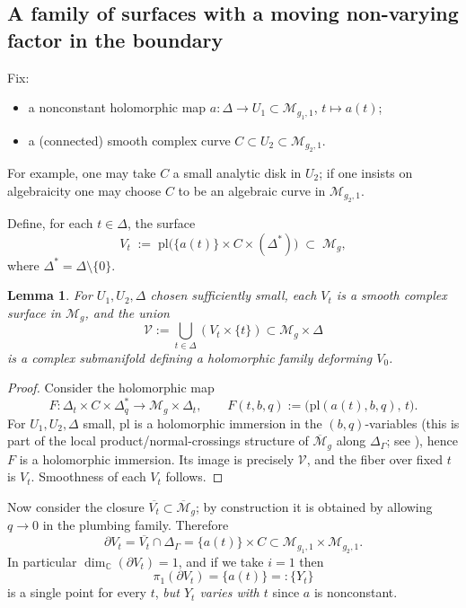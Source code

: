 \documentclass[11pt]{article}
\newtheorem{lemma}[theorem]{Lemma}
\newcommand{\Mg}{\mathcal M_g}
\newcommand{\Mgn}[2]{\mathcal M_{#1,#2}}
\newcommand{\Mbar}{\overline{\mathcal M}_g}
\newcommand{\C}{\mathbb C}
\newcommand{\D}{\Delta}
\begin{document}
\subsection{A family of surfaces with a moving non-varying factor in the boundary}

Fix:
\begin{itemize}
\item a nonconstant holomorphic map $a:\D\to U_1\subset \Mgn{g_1}{1}$, $t\mapsto a(t)$;
\item a (connected) smooth complex curve $C\subset U_2\subset \Mgn{g_2}{1}$.
\end{itemize}
For example, one may take $C$ a small analytic disk in $U_2$; if one insists on algebraicity one may choose $C$ to be an algebraic curve in $\Mgn{g_2}{1}$.

Define, for each $t\in\D$, the surface
\[
V_t \;:=\; \mathrm{pl}\bigl(\{a(t)\}\times C \times (\D^\ast)\bigr)\;\subset\; \Mg,
\]
where $\D^\ast=\D\setminus\{0\}$.

\begin{lemma}\label{lem:Vt-smooth}
For $U_1,U_2,\D$ chosen sufficiently small, each $V_t$ is a smooth complex surface in $\Mg$, and the union
\[
\mathcal V:=\bigcup_{t\in\D} (V_t\times\{t\}) \subset \Mg\times \D
\]
is a complex submanifold defining a holomorphic family deforming $V_0$.
\end{lemma}

\begin{proof}
Consider the holomorphic map
\[
F:\D_t\times C \times \D_q^\ast \to \Mg\times \D_t,\qquad
F(t,b,q) :=\bigl(\mathrm{pl}(a(t),b,q),\,t\bigr).
\]
For $U_1,U_2,\D$ small, $\mathrm{pl}$ is a holomorphic immersion in the $(b,q)$-variables (this is part of the local product/normal-crossings structure of $\Mbar$ along $\Delta_\Gamma$; see \cite[Ch.~3]{HM}), hence $F$ is a holomorphic immersion. Its image is precisely $\mathcal V$, and the fiber over fixed $t$ is $V_t$. Smoothness of each $V_t$ follows.
\end{proof}

Now consider the closure $\overline{V_t}\subset \Mbar$; by construction it is obtained by allowing $q\to 0$ in the plumbing family. Therefore
\[
\partial V_t=\overline{V_t}\cap \Delta_\Gamma = \{a(t)\}\times C \subset \Mgn{g_1}{1}\times \Mgn{g_2}{1}.
\]
In particular $\dim_\C(\partial V_t)=1$, and if we take $i=1$ then
\[
\pi_1(\partial V_t)=\{a(t)\}=: \{Y_t\}
\]
is a single point for every $t$, \emph{but $Y_t$ varies with $t$} since $a$ is nonconstant.
\end{document}

